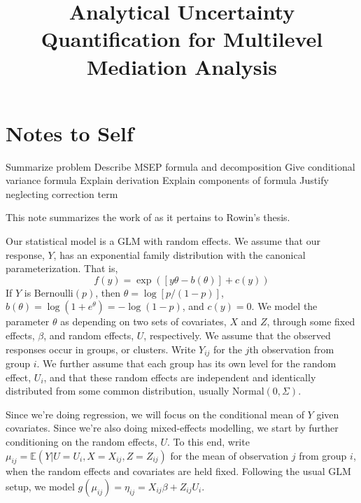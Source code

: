 \documentclass{article}
\title{Analytical Uncertainty Quantification for Multilevel Mediation Analysis}
\newcommand{\bE}{\mathbb{E}}
\begin{document}
\maketitle
\section{Notes to Self}
\begin{outline}
    \1 Summarize problem
    \1 Describe MSEP formula and decomposition
    \1 Give conditional variance formula 
        \2 Explain derivation
        \2 Explain components of formula
    \1 Justify neglecting correction term
\end{outline}

This note summarizes the work of \citet{Boo98} as it pertains to Rowin's thesis.

Our statistical model is a GLM with random effects. We assume that our response, $Y$, has an exponential family distribution with the canonical parameterization. That is,
%
\begin{equation}
    f(y) = \exp\left( \left[y \theta - b(\theta)\right] + c(y) \right) \label{eq:exp_dens}
\end{equation}
%
If $Y$ is Bernoulli$(p)$, then $\theta = \log[p/(1-p)]$, $b(\theta) = \log(1 + e^\theta) = -\log(1-p)$, and $c(y) = 0$. We model the parameter $\theta$ as depending on two sets of covariates, $X$ and $Z$, through some fixed effects, $\beta$, and random effects, $U$, respectively. We assume that the observed responses occur in groups, or clusters. Write $Y_{ij}$ for the $j$th observation from group $i$. We further assume that each group has its own level for the random effect, $U_i$, and that these random effects are independent and identically distributed from some common distribution, usually Normal$(0, \Sigma)$.


Since we're doing regression, we will focus on the conditional mean of $Y$ given covariates. Since we're also doing mixed-effects modelling, we start by further conditioning on the random effects, $U$. To this end, write $\mu_{ij} = \bE (Y |U = U_i, X = X_{ij}, Z = Z_{ij})$ for the mean of observation $j$ from group $i$, when the random effects and covariates are held fixed. Following the usual GLM setup, we model $g(\mu_{ij}) = \eta_{ij} = X_{ij} \beta + Z_{ij} U_i$. 
\end{document}
